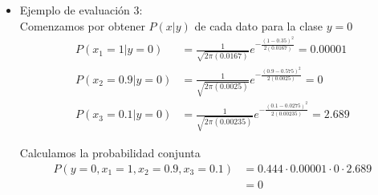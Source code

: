 \begin{itemize}
    Calculamos la probabilidad conjunta
    \begin{align*}
        P(y=0, x_1=0.8, x_2=0.5, x_3=1) & = 0.444 \cdot 0.0071 \cdot 2.59 \cdot 0 \\
        & = 0
    \end{align*}

    Ahora veamos que sucede en la clase $y=1$
    \begin{align*}
        P(x_1=0.8|y=1) & = \frac{1}{\sqrt{2\pi(0.0375)}} e^{-\frac{(0.8-0.75)^2}{2(0.0375)}} = 1.992 \\
        P(x_2=0.5|y=1) & = \frac{1}{\sqrt{2\pi(0.0145)}} e^{-\frac{(0.5-0.73)^2}{2(0.0145)}} = 0.534 \\
        P(x_3=1|y=1) & = \frac{1}{\sqrt{2\pi(0.047)}} e^{-\frac{(1-0.82)^2}{2(0.047)}} = 1.303
    \end{align*}

    Calculamos la probabilidad conjunta
    \begin{align*}
        P(y=1, x_1=0.8, x_2=0.5, x_3=1) & = 0.556 \cdot 1.992 \cdot 0.534 \cdot 1.303 \\
        & = 0.7706
    \end{align*}
    
    Veamos que la probabilidad conjunta de la clase $y=1$ es mayor que la de la clase $y=0$, por lo que se estima que este ejemplo de evaluación pertenece a la clase $y=1$ con una probabilidad de $\frac{0.7706}{0 + 0.7706} = 1$, lo cual coincide con lo indicado ya que se indica que es de la clase $y=1$.
    \newpage
    
    \item Ejemplo de evaluación 3:\\
    Comenzamos por obtener $P(x|y)$ de cada dato para la clase $y=0$
    \begin{align*}
        P(x_1=1|y=0) & = \frac{1}{\sqrt{2\pi(0.0167)}} e^{-\frac{(1-0.35)^2}{2(0.0167)}} = 0.00001  \\
        P(x_2=0.9|y=0) & = \frac{1}{\sqrt{2\pi(0.0025)}} e^{-\frac{(0.9-0.575)^2}{2(0.0025)}} = 0 \\
        P(x_3=0.1|y=0) & = \frac{1}{\sqrt{2\pi(0.00235)}} e^{-\frac{(0.1-0.0275)^2}{2(0.00235)}} = 2.689
    \end{align*}

    Calculamos la probabilidad conjunta
    \begin{align*}
        P(y=0, x_1=1, x_2=0.9, x_3=0.1) & = 0.444 \cdot 0.00001 \cdot 0 \cdot 2.689 \\
        & = 0
    \end{align*}


\end{itemize}
